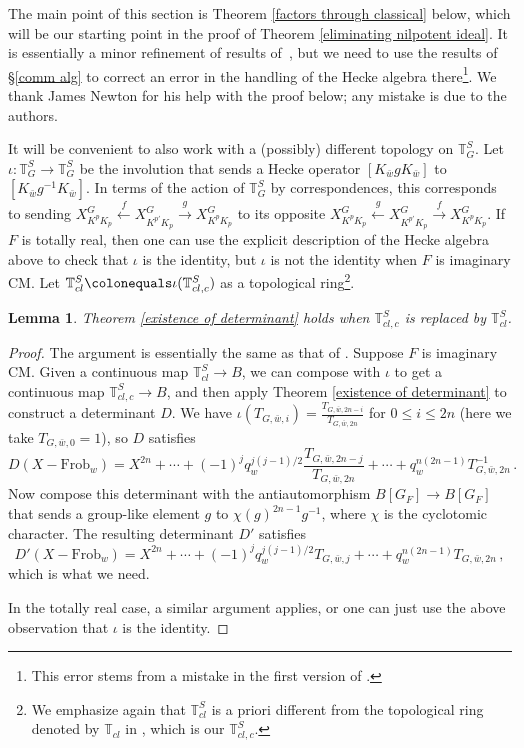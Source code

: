 \documentclass{amsart}
\newtheorem{lem}[subsubsection]{Lemma}
\theoremstyle{remark}
\numberwithin{equation}{subsection}
\newcommand{\TT}{{\mathbb T}}
\newcommand{\defeq}{\colonequals}
\renewcommand{\(}{\left(}
\renewcommand{\)}{\right)}
\begin{document}
\noindent The main point of this section is Theorem \ref{factors through classical} below, which will be our starting point in the proof of Theorem \ref{eliminating nilpotent ideal}. It is essentially a minor refinement of results of~\cite{newton-thorne}, but we need to use the results of \S \ref{comm alg} to correct an error in the handling of the Hecke algebra there\footnote{This error stems from a mistake in the first version of \cite{scholze-galois}.}. We thank James Newton for his help with the proof below; any mistake is due to the authors.

\medskip

It will be convenient to also work with a (possibly) different topology
on $\mathbb{T}^S_G$.  Let $\iota \colon \mathbb{T}^S_G \to \mathbb{T}^S_G$
be the involution that sends a Hecke operator $[K_{\bar{w}}gK_{\bar{w}}]$ to $[K_{\bar{w}}g^{-1}K_{\bar{w}}]$. In terms of the action of $\TT_G^S$ by correspondences, this corresponds to sending
$X^G_{K^p K_p} \xleftarrow{f} X^G_{K^{p \prime} K_p} \xrightarrow{g}
X^G_{K^p K_p}$ to its opposite
$X^G_{K^p K_p} \xleftarrow{g} X^G_{K^{p \prime} K_p} \xrightarrow{f}
X^G_{K^p K_p}$. 
If $F$ is totally real, then one can use the explicit description
of the Hecke algebra above to check that $\iota$ is
the identity, but $\iota$ is not the identity when $F$ is imaginary CM. Let $\mathbb{T}^S_{cl} \defeq \iota(\mathbb{T}^S_{cl,c})$ as a topological ring\footnote{We emphasize again that $\mathbb{T}_{cl}^S$ is a priori different from the topological ring denoted by $\mathbb{T}_{cl}$ in \cite{scholze-galois}, which is our $\mathbb{T}_{cl,c}^S$.}.

\begin{lem} \label{existence of determinant dual}
Theorem \ref{existence of determinant} holds when $\mathbb{T}^S_{cl,c}$
is replaced by $\mathbb{T}^S_{cl}$.
\end{lem}
\begin{proof}
The argument is essentially the same as that
of \cite[Lemma 4.1]{newton-thorne}.  Suppose $F$ is imaginary CM.
Given a continuous map $\mathbb{T}^S_{cl} \to B$, we can compose with
$\iota$ to get a continuous map $\mathbb{T}^S_{cl,c} \to B$,
and then apply Theorem \ref{existence of determinant} to construct
a determinant $D$.
We have $\iota(T_{G,\bar{w},i})=\frac{T_{G,\bar{w},{2n-i}}}{T_{G,\bar{w},2n}}$ for $0 \le i \le 2n$
(here we take $T_{G,\bar{w},0} = 1$), so $D$ satisfies
\[
D(X - \mathrm{Frob}_{w}) = X^{2n}+\dotsb+(-1)^j q_w^{j(j-1)/2} \frac{T_{G, \bar{w}, {2n-j}}}{T_{G,\bar{w},2n}}  +\dotsb +q^{n(2n-1)}_w T_{G,\bar{w},2n}^{-1} \,.
\]
Now compose this determinant with the antiautomorphism
$B[G_F] \to B[G_F]$ that sends a group-like element $g$ to
$\chi(g)^{2n-1} g^{-1}$, where $\chi$ is the cyclotomic character.
The resulting determinant $D'$ satisfies
\[
D'(X - \mathrm{Frob}_{w}) = X^{2n}+\dotsb+(-1)^j q_{w}^{j(j-1)/2} T_{G, \bar{w}, j}+\dotsb +q^{n(2n-1)}_w T_{G,\bar{w},2n} \,,
\]
which is what we need.

\medskip

In the totally real case, a similar argument applies, or one can just use the above observation that
$\iota$ is the identity.
\end{proof}
\end{document}

